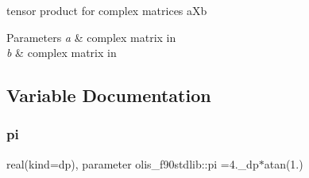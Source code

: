 tensor product for complex matrices a\+Xb 


\begin{DoxyParams}{Parameters}
{\em a} & complex matrix in \\
\hline
{\em b} & complex matrix in \\
\hline
\end{DoxyParams}


\subsection{Variable Documentation}
\mbox{\label{namespaceolis__f90stdlib_a106e09303fbf05972f0635ff67f73c9d}} 
\subsubsection{\texorpdfstring{pi}{pi}}
{\footnotesize\ttfamily real(kind=dp), parameter olis\+\_\+f90stdlib\+::pi =4.\+\_\+dp$\ast$atan(1.)}

